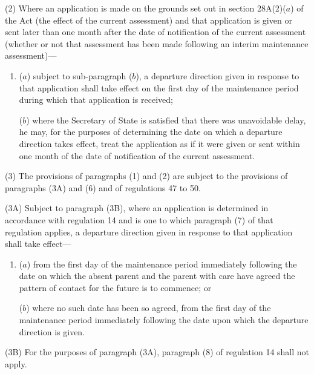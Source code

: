 \documentclass[12pt,a4paper]{article}
\begin{document}
(2) Where an application is made on the grounds set out in section 28A(2)($a$) of the Act (the effect of the current assessment) and that application is given or sent later than 
one month  %
after the date of notification of the current assessment (whether or not that assessment has been made following an interim maintenance assessment)—
\begin{enumerate}\item[]
($a$) subject to sub-paragraph ($b$), a departure direction given in response to that application shall take effect on the first day of the maintenance period during which that application is received;

($b$) where the Secretary of State is satisfied that there was unavoidable delay, he may, for the purposes of determining the date on which a departure direction takes effect, treat the application as if it were given or sent within 
one month  %
of the date of notification of the current assessment.
\end{enumerate}

(3) The provisions of paragraphs (1) and (2) are subject to the provisions of 
paragraphs (3A) and (6)  %
and of regulations 47 to 50.

(3A) 
Subject to paragraph (3B), where  %
an application is determined in accordance with regulation 14 and is one to which paragraph (7) of that regulation applies, a departure direction given in response to that application shall take effect—
\begin{enumerate}\item[]
($a$) from the first day of the maintenance period immediately following the date on which the absent parent and the parent with care have agreed the pattern of contact for the future is to commence; or

($b$) where no such date has been so agreed, from the first day of the maintenance period immediately following the date upon which the departure direction is given.
\end{enumerate}

(3B) For the purposes of paragraph (3A), paragraph (8) of regulation 14 shall not apply.
\end{document}
